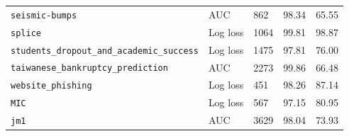 \begin{table}[!htbp]
\begin{tabularx}{\textwidth}{@{}XL{0.15\textwidth}N{0.12\textwidth}N{0.12\textwidth}N{0.12\textwidth}@{}}
\nolinkurl{seismic-bumps} & AUC & 862 & 98.34 & 65.55\\
\nolinkurl{splice} & Log loss & 1064 & 99.81 & 98.87\\
\nolinkurl{students_dropout_and_academic_success} & Log loss & 1475 & 97.81 & 76.00\\
\nolinkurl{taiwanese_bankruptcy_prediction} & AUC & 2273 & 99.86 & 66.48\\
\nolinkurl{website_phishing} & Log loss & 451 & 98.26 & 87.14\\
\nolinkurl{MIC} & Log loss & 567 & 97.15 & 80.95\\
\nolinkurl{jm1} & AUC & 3629 & 98.04 & 73.93\\
\bottomrule
\end{tabularx}
\end{table}
